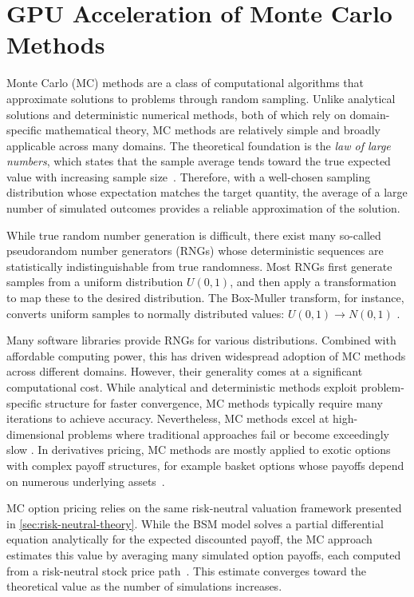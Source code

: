 \documentclass[english,12pt,a4paper,pdftex,sci,utf8]{aaltothesis}
\begin{document}
\section{GPU Acceleration of Monte Carlo Methods} \label{sec:gpu-mc}
Monte Carlo (MC) methods are a class of computational algorithms that approximate solutions to problems through random sampling. Unlike analytical solutions and deterministic numerical methods, both of which rely on domain-specific mathematical theory, MC methods are relatively simple and broadly applicable across many domains. The theoretical foundation is the \emph{law of large numbers}, which states that the sample average tends toward the true expected value with increasing sample size~\cite{Ross2020prob}. Therefore, with a well-chosen sampling distribution whose expectation matches the target quantity, the average of a large number of simulated outcomes provides a reliable approximation of the solution.

While true random number generation is difficult, there exist many so-called pseudorandom number generators (RNGs) whose deterministic sequences are statistically indistinguishable from true randomness. Most RNGs first generate samples from a uniform distribution $U(0,1)$, and then apply a transformation to map these to the desired distribution. The Box-Muller transform, for instance, converts uniform samples to normally distributed values: $U(0,1) \rightarrow N(0,1)$ \cite{gentle2003random}.

Many software libraries provide RNGs for various distributions. Combined with affordable computing power, this has driven widespread adoption of MC methods across different domains. However, their generality comes at a significant computational cost. While analytical and deterministic methods exploit problem-specific structure for faster convergence, MC methods typically require many iterations to achieve accuracy. Nevertheless, MC methods excel at high-dimensional problems where traditional approaches fail or become exceedingly slow \cite{gentle2003random}. In derivatives pricing, MC methods are mostly applied to exotic options with complex payoff structures, for example basket options whose payoffs depend on numerous underlying assets~\cite{hull2018,wilmott2013paul}.

MC option pricing relies on the same risk-neutral valuation framework presented in \cref{sec:risk-neutral-theory}. While the BSM model solves a partial differential equation analytically for the expected discounted payoff, the MC approach estimates this value by averaging many simulated option payoffs, each computed from a risk-neutral stock price path~\cite{boyle1977options}. This estimate converges toward the theoretical value as the number of simulations increases.
\end{document}
